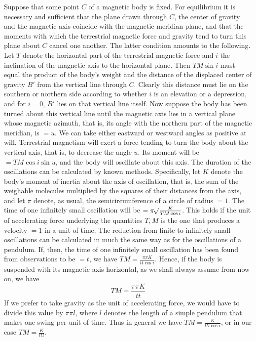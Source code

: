 Suppose that some point $C$ of a magnetic body is fixed. For equilibrium it is necessary and sufficient that the plane drawn through $C$, the center of gravity and the magnetic axis coincide with the magnetic meridian plane, and that the moments with which the terrestrial magnetic force and gravity tend to turn this plane about $C$ cancel one another. The latter condition amounts to the following. Let $T$ denote the horizontal part of the terrestrial magnetic force and $i$ the inclination of the magnetic axis to the horizontal plane. Then $TM\sin i$ must equal the product of the body's weight and the distance of the displaced center of gravity $B'$ from the vertical line through $C$. Clearly this distance must lie on the southern or northern side according to whether $i$ is an elevation or a depression, and for $i=0$, $B'$ lies on that vertical line itself. Now suppose the body has been turned about this vertical line until the magnetic axis lies in a vertical plane whose magnetic azimuth, that is, its angle with the northern part of the magnetic meridian, is $=u$. We can take either eastward or westward angles as positive at will. Terrestrial magnetism will exert a force tending to turn the body about the vertical axis, that is, to decrease the angle $u$. Its moment will be $=TM\cos i\sin u$, and the body will oscillate about this axis. The duration of the oscillations can be calculated by known methods. Specifically, let $K$ denote the body's moment of inertia about the axis of oscillation, that is, the sum of the weighable molecules multiplied by the squares of their distances from the axis, and let $\pi$ denote, as usual, the semicircumference of a circle of radius $=1$. The time of one infinitely small oscillation will be $=\pi\mathord{{}^{}\!\surd}\frac{K}{TM\cos i}$. This holds if the unit of accelerating force underlying the quantities $T,M$ is the one that produces a velocity $=1$ in a unit of time. The reduction from finite to infinitely small oscillations can be calculated in much the same way as for the oscillations of a pendulum. If, then, the time of one infinitely small oscillation has been found from observations to be $=t$, we have $TM=\frac{\pi\pi K}{tt\cos i}$. Hence, if the body is suspended with its magnetic axis horizontal, as we shall always assume from now on, we have
\[
TM=\frac{\pi\pi K}{tt}
\]
If we prefer to take gravity as the unit of accelerating force, we would have to divide this value by $\pi\pi l$, where $l$ denotes the length of a simple pendulum that makes one swing per unit of time. Thus in general we have $TM=\frac{K}{ttl\cos i}$, or in our case $TM=\frac{K}{ttl}$.
